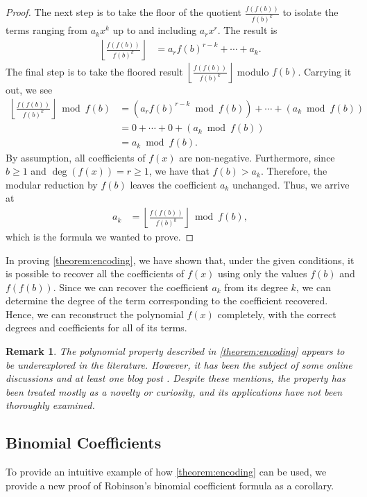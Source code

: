 \documentclass[10pt]{article}
\theoremstyle{plain}
\newtheorem{remark}{Remark}[section]
\newcommand{\floor}[1]{\left\lfloor #1 \right\rfloor}
\begin{document}
\begin{proof}
The next step is to take the floor of the quotient $\frac{f(f(b))}{f(b)^k}$ to isolate the terms ranging from $a_k x^k$ up to and including $a_r x^r$. The result is
\begin{align*}
\floor{\frac{f(f(b))}{f(b)^k}} &= a_r f(b)^{r-k} + \cdots + a_{k} .
\end{align*}
The final step is to take the floored result $\floor{\frac{f(f(b))}{f(b)^k}}$ modulo $f(b)$. Carrying it out, we see
\begin{align*}
\floor{\frac{f(f(b))}{f(b)^k}} \bmod{f(b)} &= (a_r f(b)^{r-k} \bmod{f(b)}) + \cdots + (a_k \bmod{f(b)}) \\
&= 0 + \cdots + 0 + (a_k \bmod{f(b)}) \\
&= a_k \bmod{f(b)} .
\end{align*}
By assumption, all coefficients of $f(x)$ are non-negative. Furthermore, since $b \geq 1$ and $\deg(f(x)) = r \geq 1$, we have that $f(b) > a_k$. Therefore, the modular reduction by $f(b)$ leaves the coefficient $a_k$ unchanged. Thus, we arrive at
\begin{align*}
a_k &= \floor{\frac{f(f(b))}{f(b)^k}} \bmod{f(b)} ,
\end{align*}
which is the formula we wanted to prove.
\end{proof}

In proving \cref{theorem:encoding}, we have shown that, under the given conditions, it is possible to recover all the coefficients of $f(x)$ using only the values $f(b)$ and $f(f(b))$. Since we can recover the coefficient $a_k$ from its degree $k$, we can determine the degree of the term corresponding to the coefficient recovered. Hence, we can reconstruct the polynomial $f(x)$ completely, with the correct degrees and coefficients for all of its terms.

\begin{remark}
The polynomial property described in \cref{theorem:encoding} appears to be underexplored in the literature. However, it has been the subject of some online discussions \cite{mathoverflow2012application, reddit2023determine} and at least one blog post \cite{jcook2012polynomial}. Despite these mentions, the property has been treated mostly as a novelty or curiosity, and its applications have not been thoroughly examined.
\end{remark}

\subsection{Binomial Coefficients}
To provide an intuitive example of how \cref{theorem:encoding} can be used, we provide a new proof of Robinson's binomial coefficient formula \cite{robinson1952arithmetic} as a corollary.
\end{document}
